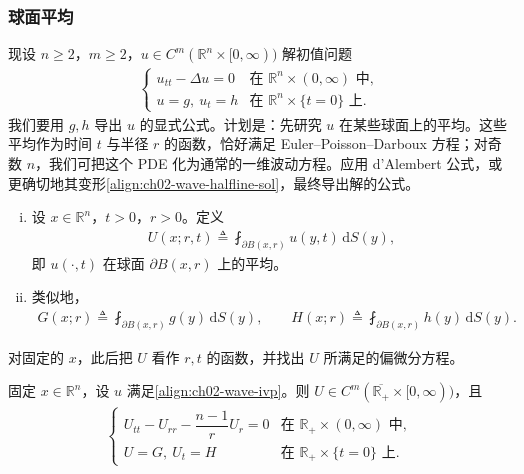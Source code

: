 \documentclass[../../main.tex]{subfiles}
\begin{document}
\subsubsection{球面平均}

现设 $n\geqslant 2$，$m\geqslant 2$，$u\in C^m(\mathbb{R}^n\times[0,\infty))$ 解初值问题
\begin{align}\label{align:ch02-wave-ivp}
\begin{cases}
u_{tt}-\Delta u=0 & \text{在 }\mathbb{R}^n\times(0,\infty)\text{ 中},\\
u=g,\ u_t=h & \text{在 }\mathbb{R}^n\times\{t=0\}\text{ 上}.
\end{cases}
\end{align}
我们要用 $g,h$ 导出 $u$ 的显式公式。计划是：先研究 $u$ 在某些球面上的平均。这些平均作为时间 $t$ 与半径 $r$ 的函数，恰好满足 Euler--Poisson--Darboux 方程；对奇数 $n$，我们可把这个 PDE 化为通常的一维波动方程。应用 d'Alembert 公式，或更确切地其变形\eqref{align:ch02-wave-halfline-sol}，最终导出解的公式。

\begin{definition}\label{definition:ch02-spherical-avg}
\begin{enumerate}[(i)]
\item 设 $x\in\mathbb{R}^n$，$t>0$，$r>0$。定义
\begin{align}\label{align:ch02-spherical-U}
U(x;r,t)\triangleq\fint_{\partial B(x,r)}u(y,t)\,\mathrm{d}S(y),
\end{align}
即 $u(\cdot,t)$ 在球面 $\partial B(x,r)$ 上的平均。
\item 类似地，
\begin{align}\label{align:ch02-spherical-GH}
G(x;r)\triangleq\fint_{\partial B(x,r)}g(y)\,\mathrm{d}S(y),\qquad
H(x;r)\triangleq\fint_{\partial B(x,r)}h(y)\,\mathrm{d}S(y).
\end{align}
\end{enumerate}
\end{definition}

对固定的 $x$，此后把 $U$ 看作 $r,t$ 的函数，并找出 $U$ 所满足的偏微分方程。

\begin{lemma}\label{lemma:ch02-epd}固定 $x\in\mathbb{R}^n$，设 $u$ 满足\eqref{align:ch02-wave-ivp}。则 $U\in C^m(\overline{\mathbb{R}_+}\times[0,\infty))$，且
\begin{align}\label{align:ch02-epd}
\begin{cases}
U_{tt}-U_{rr}-\dfrac{n-1}{r}U_r=0 & \text{在 }\mathbb{R}_+\times(0,\infty)\text{ 中},\\
U=G,\ U_t=H & \text{在 }\mathbb{R}_+\times\{t=0\}\text{ 上}.
\end{cases}
\end{align}
\end{lemma}
\end{document}
